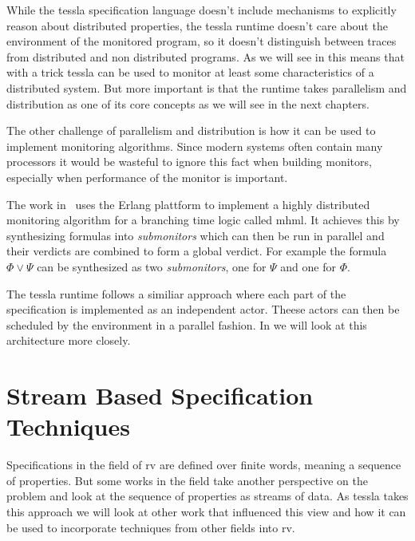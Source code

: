While the \gls{tessla} specification language doesn't include mechanisms to explicitly reason about distributed properties, the \gls{tessla} runtime doesn't care about the environment of the monitored program, so it doesn't distinguish between traces from distributed and non distributed programs.
As we will see in  this means that with a trick \gls{tessla} can be used to monitor at least some characteristics of a distributed system.
But more important is that the runtime takes parallelism and distribution as one of its core concepts as we will see in the next chapters.

The other challenge of parallelism and distribution is how it can be used to implement monitoring algorithms.
Since modern systems often contain many processors it would be wasteful to ignore this fact when building monitors, especially when performance of the monitor is important.

The work in~\cite{Attard2016} uses the Erlang plattform to implement a highly distributed monitoring algorithm for a branching time logic called \gls{mhml}.
It achieves this by synthesizing formulas into \emph{submonitors} which can then be run in parallel and their verdicts are combined to form a global verdict.
For example the formula \(\Phi \vee \Psi\) can be synthesized as two \emph{submonitors}, one for \(\Psi\) and one for \(\Phi\).

The \gls{tessla} runtime follows a similiar approach where each part of the specification is implemented as an independent actor.
Theese actors can then be scheduled by the environment in a parallel fashion.
In  we will look at this architecture more closely.

\section{Stream Based Specification Techniques}
\label{sec:related:stream_based}

Specifications in the field of \gls{rv} are defined over finite words, meaning a sequence of properties.
But some works in the field take another perspective on the problem and look at the sequence of properties as streams of data.
As \gls{tessla} takes this approach we will look at other work that influenced this view and how it can be used to incorporate techniques from other fields into \gls{rv}.

\subsection{}
\label{sec:related:stream_based:lola}


